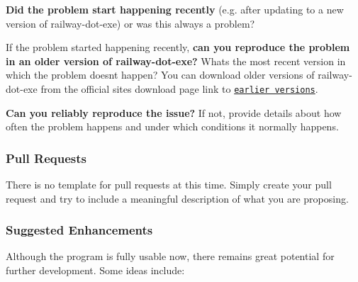 \begin{DoxyItemize}
\item {\bfseries Did the problem start happening recently} (e.\+g. after updating to a new version of railway-\/dot-\/exe) or was this always a problem?
\item If the problem started happening recently, {\bfseries can you reproduce the problem in an older version of railway-\/dot-\/exe?} What\textquotesingle{}s the most recent version in which the problem doesn\textquotesingle{}t happen? You can download older versions of railway-\/dot-\/exe from the official site\textquotesingle{}s download page link to \href{https://www.dropbox.com/sh/wvruss55cfzdvgw/AAApyZeGaIRyJAtS6clOuo0La?dl=0}{\tt earlier versions}.
\item {\bfseries Can you reliably reproduce the issue?} If not, provide details about how often the problem happens and under which conditions it normally happens.
\end{DoxyItemize}

\subsubsection*{Pull Requests}


\begin{DoxyItemize}
\item There is no template for pull requests at this time. Simply create your pull request and try to include a meaningful description of what you are proposing.
\end{DoxyItemize}

\subsubsection*{Suggested Enhancements}

Although the program is fully usable now, there remains great potential for further development. Some ideas include\+:



